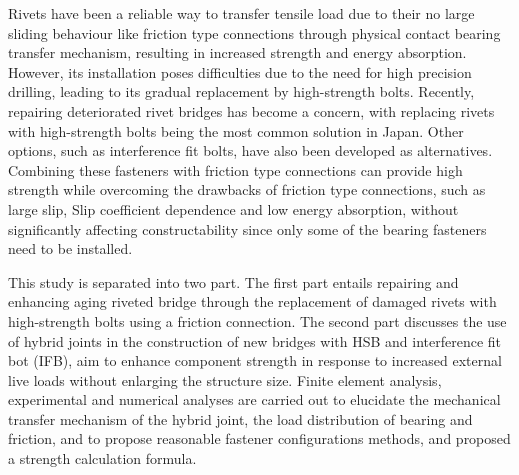 

\onehalfspacing 

Rivets have been a reliable way to transfer tensile load due to their no large sliding behaviour like friction type connections through physical contact bearing transfer mechanism, resulting in increased strength and energy absorption. However, its installation poses difficulties due to the need for high precision drilling, leading to its gradual replacement by high-strength bolts. Recently, repairing deteriorated rivet bridges has become a concern, with replacing rivets with high-strength bolts being the most common solution in Japan. Other options, such as interference fit bolts, have also been developed as alternatives. Combining these fasteners with friction type connections can provide high strength while overcoming the drawbacks of friction type connections, such as large slip, Slip coefficient dependence and low energy absorption, without significantly affecting constructability since only some of the bearing fasteners need to be installed.

This study is separated into two part. The first part entails repairing and enhancing aging riveted bridge through the replacement of damaged rivets with high-strength bolts using a friction connection. The second part discusses the use of hybrid joints in the construction of new bridges with HSB and interference fit bot (IFB), aim to enhance component strength in response to increased external live loads without enlarging the structure size. Finite element analysis, experimental and numerical analyses are carried out to elucidate the mechanical transfer mechanism of the hybrid joint, the load distribution of bearing and friction, and to propose reasonable fastener configurations methods, and proposed a strength calculation formula.


